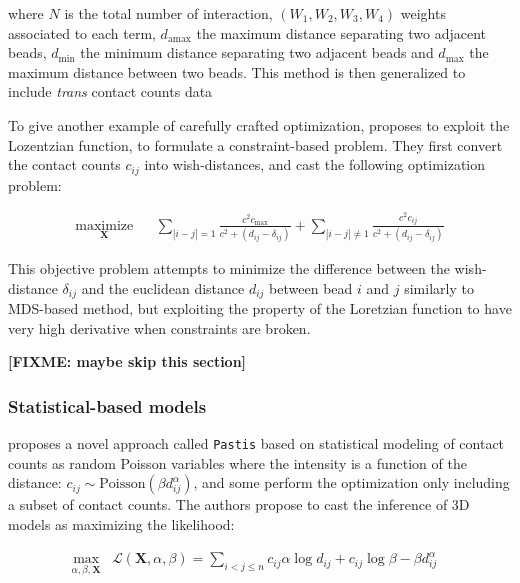 \documentclass[letterpaper,12pt]{article}
\newcommand{\fixme}[1]{\textbf{[FIXME: #1]}}
\newcommand{\Xb}{\textbf{X}}
\begin{document}
where $N$ is the total number of interaction, $(W_1, W_2, W_3, W_4)$ weights
associated to each term, $d_\text{amax}$ the maximum distance separating two
adjacent beads, $d_\text{min}$ the minimum distance separating two adjacent
beads and $d_\text{max}$ the maximum distance between two beads. 
This method is then generalized to include \textit{trans} contact counts data
\citep{trieu:MOGEN}

To give another example of carefully crafted optimization, \cite{trieu:3D}
proposes to exploit the Lozentzian function, to formulate a constraint-based
problem. They first convert the contact counts $c_{ij}$ into wish-distances,
and cast the following optimization problem:

\begin{equation*}
\renewcommand{\arraystretch}{2}
\begin{array}{ccl}
\underset{\Xb}{\text{maximize}} & & \underset{| i - j | = 1}{\sum} \frac{c^2
c_\text{max}}{c^2 + (d_{ij} - \delta_{ij})} + 
\underset{| i - j | \neq 1}{\sum} \frac{c^2 c_{ij}}{c^2 + (d_{ij} - \delta_{ij})}
\end{array}
\end{equation*}

This objective problem attempts to minimize the difference between the
wish-distance $\delta_{ij}$ and the euclidean distance $d_{ij}$ between bead
$i$ and $j$ similarly to MDS-based method, but exploiting the property of the
Loretzian function to have very high derivative when constraints are broken.

\fixme{maybe skip this section}


\subsubsection*{Statistical-based models}

\citet{varoquaux:statistical} proposes a novel approach called \texttt{Pastis}
based on statistical modeling of contact counts as random Poisson variables
where the intensity is a function of the distance: $c_{ij} \sim
\text{Poisson}(\beta d_{ij}^\alpha)$, and some perform the optimization only
including a subset of contact counts. The authors propose to cast the
inference of 3D models as maximizing the likelihood:

\begin{equation}
\renewcommand{\arraystretch}{2}
\begin{array}{cll}
\underset{\alpha, \beta, \textbf{X}}{\text{max}} &
\mathcal{L}(\mathbf{X}, \alpha, \beta) = \underset{i<j\leq n}{\sum}  c_{ij}
\alpha \log d_{ij} + c_{ij} \log \beta - \beta d_{ij}^\alpha &\\
\end{array}
\end{equation}
\end{document}
